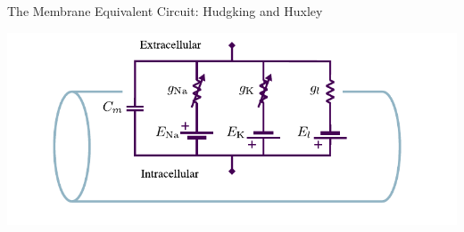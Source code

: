 \documentclass[aspectratio=169]{beamer}
\begin{document}
\begin{frame}{The Membrane Equivalent Circuit: Hudgking and Huxley}
    \begin{center}
        \includegraphics[width=\textwidth]{images/compartment.pdf}
    \end{center}
\end{frame}
\end{document}
